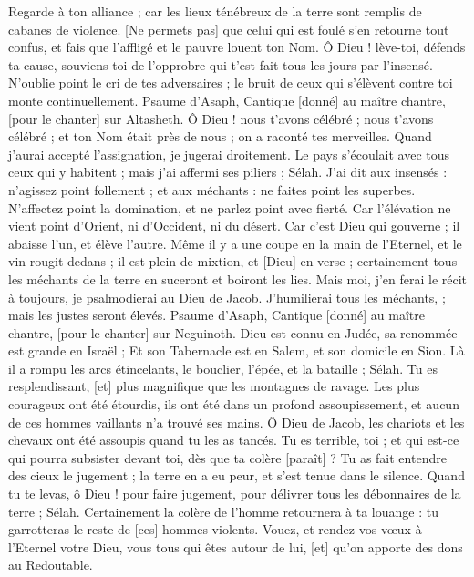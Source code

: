 \begin{multicols}{2}
Regarde à ton alliance ; car les lieux ténébreux de la terre sont remplis de cabanes de violence.
[Ne permets pas] que celui qui est foulé s'en retourne tout confus, et fais que l'affligé et le pauvre louent ton Nom.
Ô Dieu ! lève-toi, défends ta cause, souviens-toi de l'opprobre qui t'est fait tous les jours par l'insensé.
N'oublie point le cri de tes adversaires ; le bruit de ceux qui s'élèvent contre toi monte continuellement.
\VerseOne{}Psaume d'Asaph, Cantique [donné] au maître chantre, [pour le chanter] sur Altasheth. Ô Dieu ! nous t'avons célébré ; nous t'avons célébré ; et ton Nom était près de nous ; on a raconté tes merveilles.
Quand j'aurai accepté l'assignation, je jugerai droitement.
Le pays s'écoulait avec tous ceux qui y habitent ; mais j'ai affermi ses piliers ; Sélah.
J'ai dit aux insensés : n'agissez point follement ; et aux méchants : ne faites point les superbes.
N'affectez point la domination, et ne parlez point avec fierté.
Car l'élévation ne vient point d'Orient, ni d'Occident, ni du désert.
Car c'est Dieu qui gouverne ; il abaisse l'un, et élève l'autre.
Même il y a une coupe en la main de l'Eternel, et le vin rougit dedans ; il est plein de mixtion, et [Dieu] en verse ; certainement tous les méchants de la terre en suceront et boiront les lies.
Mais moi, j'en ferai le récit à toujours, je psalmodierai au Dieu de Jacob.
J'humilierai tous les méchants, ; mais les justes seront élevés.
\VerseOne{}Psaume d'Asaph, Cantique [donné] au maître chantre, [pour le chanter] sur Neguinoth. Dieu est connu en Judée, sa renommée est grande en Israël ;
Et son Tabernacle est en Salem, et son domicile en Sion.
Là il a rompu les arcs étincelants, le bouclier, l'épée, et la bataille ; Sélah.
Tu es resplendissant, [et] plus magnifique que les montagnes de ravage.
Les plus courageux ont été étourdis, ils ont été dans un profond assoupissement, et aucun de ces hommes vaillants n'a trouvé ses mains.
Ô Dieu de Jacob, les chariots et les chevaux ont été assoupis quand tu les as tancés.
Tu es terrible, toi ; et qui est-ce qui pourra subsister devant toi, dès que ta colère [paraît] ?
Tu as fait entendre des cieux le jugement ; la terre en a eu peur, et s'est tenue dans le silence.
Quand tu te levas, ô Dieu ! pour faire jugement, pour délivrer tous les débonnaires de la terre ; Sélah.
Certainement la colère de l'homme retournera à ta louange : tu garrotteras le reste de [ces] hommes violents.
Vouez, et rendez vos vœux à l'Eternel votre Dieu, vous tous qui êtes autour de lui, [et] qu'on apporte des dons au Redoutable.

\end{multicols}
